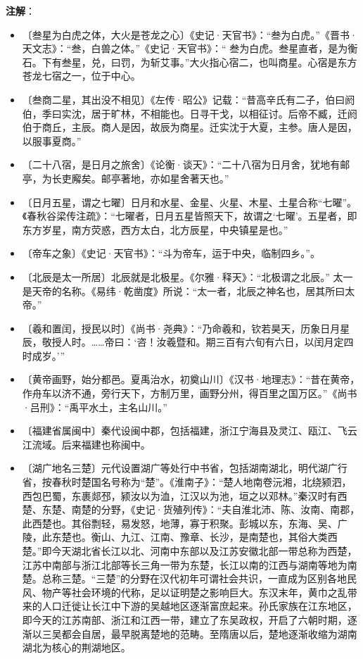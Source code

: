 \documentclass[12pt,UTF-8,openany,a4]{ctexbook}
\begin{document}
\newpage

\begin{Large}
   \noindent \textbf{注解}：
\end{Large}

\vspace{-1em}

\begin{itemize}
    \setlength\itemsep{-0.2em}
    \item〔叁星为白虎之体，大火是苍龙之心〕{\yiwen 《史记·天官书》：“叁为白虎。”《晋书·天文志》：“叁，白兽之体。”《史记·天官书》：“ 叁为白虎。叁星直者，是为衡石。下有叁星，兑，曰罚，为斩艾事。”大火指心宿二，也叫商星。心宿是东方苍龙七宿之一，位于中心。}
    \item〔叁商二星，其出没不相见〕{\yiwen 《左传·昭公》记载：“昔高辛氏有二子，伯曰阏伯，季曰实沈，居于旷林，不相能也。日寻干戈，以相征讨。后帝不臧，迁阏伯于商丘，主辰。商人是因，故辰为商星。迁实沈于大夏，主参。唐人是因，以服事夏商。”}
    \item〔二十八宿，是日月之旅舍〕{\yiwen 《论衡·谈天》：“二十八宿为日月舍，犹地有邮亭，为长吏廨矣。邮亭著地，亦如星舍著天也。”}
    \item〔日月五星，谓之七曜〕{\yiwen 日月和水星、金星、火星、木星、土星合称“七曜”。《春秋谷梁传注疏》：“七曜者，日月五星皆照天下，故谓之‘七曜’。五星者，即东方岁星，南方荧惑，西方太白，北方辰星，中央镇星是也。”}
    \item〔帝车之象〕{\yiwen 《史记·天官书》：“斗为帝车，运于中央，临制四乡。”。}
    \item〔北辰是太一所居〕{\yiwen 北辰就是北极星。《尔雅·释天》：“北极谓之北辰。” 太一是天帝的名称。《易纬·乾凿度》所说：“太一者，北辰之神名也，居其所曰太帝。”}
    \item〔羲和置闰，授民以时〕{\yiwen 《尚书·尧典》：“乃命羲和，钦若昊天，历象日月星辰，敬授人时。……帝曰：‘咨！汝羲暨和。期三百有六旬有六日，以闰月定四时成岁。’”}
    \item〔黄帝画野，始分都邑。夏禹治水，初奠山川〕{\yiwen 《汉书·地理志》：“昔在黄帝，作舟车以济不通，旁行天下，方制万里，画野分州，得百里之国万区。”《尚书·吕刑》：“禹平水土，主名山川。”}
    \item〔福建省属闽中〕{\yiwen 秦代设闽中郡，包括福建，浙江宁海县及灵江、瓯江、飞云江流域。后来福建也称闽中。}
    \item〔湖广地名三楚〕{\yiwen 元代设置湖广等处行中书省，包括湖南湖北，明代湖广行省，按春秋时楚国名号称为“楚”。《淮南子》：“楚人地南卷沅湘，北绕颍泗，西包巴蜀，东裹郯邳，颍汝以为洫，江汉以为池，垣之以邓林。”秦汉时有西楚、东楚、南楚的分野，《史记·货殖列传》：“夫自淮北沛、陈、汝南、南郡，此西楚也。其俗剽轻，易发怒，地薄，寡于积聚。彭城以东，东海、吴、广陵，此东楚也。衡山、九江、江南、豫章、长沙，是南楚也，其俗大类西楚。”即今天湖北省长江以北、河南中东部以及江苏安徽北部一带总称为西楚，江苏中南部与浙江北部等长三角一带为东楚，长江以南的江西与湖南等地为南楚。总称三楚。“三楚”的分野在汉代初年可谓社会共识，一直成为区别各地民风、物产等社会环境的代称，足以证明楚之影响巨大。东汉末年，黄巾之乱带来的人口迁徙让长江中下游的吴越地区逐渐富庶起来。孙氏家族在江东地区，即今天的江苏南部、浙江和江西一带，建立了东吴政权，开启了六朝时期，逐渐以三吴都会自居，最早脱离楚地的范畴。至隋唐以后，楚地逐渐收缩为湖南湖北为核心的荆湖地区。}

\end{itemize}
\end{document}
